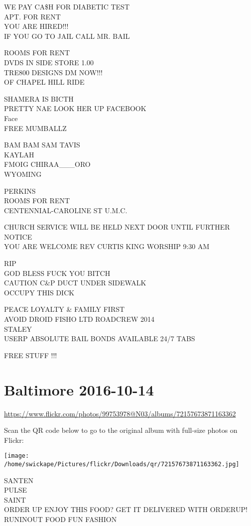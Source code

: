 \documentclass[10pt,letterpaper]{article}
\begin{document}
WE PAY CA\$H FOR DIABETIC TEST\\
APT. FOR RENT\\
YOU ARE HIRED!!!\\
IF YOU GO TO JAIL CALL MR. BAIL

ROOMS FOR RENT\\
DVDS IN SIDE STORE 1.00\\
TRE800 DESIGNS DM NOW!!!\\
OF CHAPEL HILL RIDE

SHAMERA IS BICTH\\
PRETTY NAE LOOK HER UP FACEBOOK\\
Face\\
FREE MUMBALLZ

BAM BAM SAM TAVIS\\
KAYLAH\\
FMOIG CHIRAA\_\_\_ORO\\
WYOMING

PERKINS\\
ROOMS FOR RENT\\
CENTENNIAL{-}CAROLINE ST U.M.C.

CHURCH SERVICE WILL BE HELD NEXT DOOR UNTIL FURTHER NOTICE\\
YOU ARE WELCOME REV CURTIS KING WORSHIP 9:30 AM

RIP\\
GOD BLESS FUCK YOU BITCH\\
CAUTION C\&P DUCT UNDER SIDEWALK\\
OCCUPY THIS DICK

PEACE LOYALTY \& FAMILY FIRST\\
AVOID DROID FISHO LTD ROADCREW 2014\\
STALEY\\
USERP ABSOLUTE BAIL BONDS AVAILABLE 24/7 TABS

FREE STUFF !!!
\pagebreak

\section*{Baltimore 2016-10-14}

\url{https://www.flickr.com/photos/99753978@N03/albums/72157673871163362}

Scan the QR code below to go to the original album with full-size photos on Flickr:

\texttt{[image: /home/swickape/Pictures/flickr/Downloads/qr/72157673871163362.jpg]}
\pagebreak

SANTEN\\
PULSE\\
SAINT\\
ORDER UP ENJOY THIS FOOD?  GET IT DELIVERED WITH ORDERUP!  RUNINOUT FOOD FUN FASHION
\end{document}
